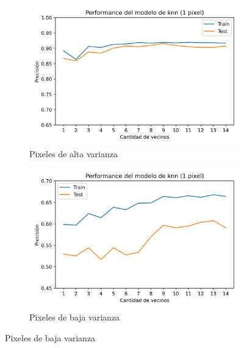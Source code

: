 \documentclass[10pt,a4paper]{article}
\begin{document}
\begin{figure}[ht!]
	\begin{subfigure}{0.5\textwidth}
		\includegraphics[width=0.9\linewidth]{Informe/Imagenes/1pixelalto.png} 
		\caption{Pixeles de alta varianza}
		\label{fig:subfig1}
	\end{subfigure}
	\begin{subfigure}{0.5\textwidth}
		\includegraphics[width=0.9\linewidth]{Informe/Imagenes/1pixelbajo.png}
		\caption{Pixeles de baja varianza}
		\label{fig:subfig2}
	\end{subfigure}
	\label{fig:subfigs}
\end{figure}
\end{document}
